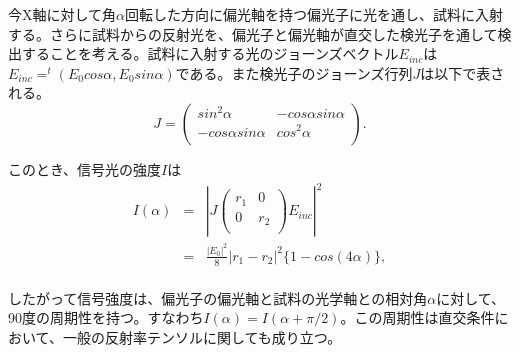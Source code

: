 今X軸に対して角$\alpha$回転した方向に偏光軸を持つ偏光子に光を通し、試料に入射する。さらに試料からの反射光を、偏光子と偏光軸が直交した検光子を通して検出することを考える。試料に入射する光のジョーンズベクトル$E_{inc}$は$E_{inc}=^t (E_0 cos\alpha, E_0 sin\alpha)$である。また検光子のジョーンズ行列$J$は以下で表される。
\[ J =\left(
    \begin{array}{cc}
      sin^2 \alpha & -cos\alpha sin\alpha  \\
      -cos\alpha sin\alpha & cos^2 \alpha  \\
    \end{array} 
  \right).
\] 

このとき、信号光の強度$I$は
\begin{eqnarray}
I(\alpha) &=& |J
 \left(
    \begin{array}{cc}
      r_1 &0  \\
      0 & r_2  \\
    \end{array} 
  \right)
  E_{inc}|^2\\
 &=& \frac{|E_0|^2}{8}|r_1-r_2|^2 \{1-cos(4\alpha)\},\\
\end{eqnarray}

したがって信号強度は、偏光子の偏光軸と試料の光学軸との相対角$\alpha$に対して、90度の周期性を持つ。すなわち$I(\alpha)=I(\alpha+\pi/2)$。この周期性は直交条件において、一般の反射率テンソルに関しても成り立つ。

\newpage